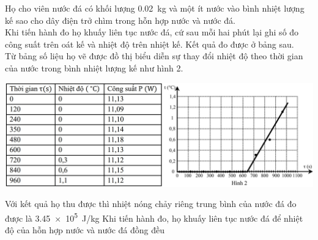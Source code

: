 \begin{ex}
	Họ cho viên nước đá có khối lượng \SI{0.02}{\kilogram} và một ít nước vào bình nhiệt lượng kế sao cho dây điện trở chìm trong hỗn hợp nước và nước đá.\\
	Khi tiến hành đo họ khuấy liên tục nước đá, cứ sau mỗi hai phút lại ghi số đo công suất trên oát kế và nhiệt độ trên nhiệt kế. Kết quả đo được ở bảng sau.\\
	Từ bảng số liệu họ vẽ được đồ thị biểu diễn sự thay đổi nhiệt độ theo thời gian của nước trong bình nhiệt lượng kế như hình 2.
	\begin{center}
		\includegraphics[scale=0.5]{figs/G12Y24B5-2}
	\end{center}
	{Với kết quả họ thu được thì nhiệt nóng chảy riêng trung bình của nước đá đo được là \SI{3.45e5}{\joule/\kilogram}}
	{\True Khi tiến hành đo, họ khuấy liên tục nước đá để nhiệt độ của hỗn hợp nước và nước đá đồng đều}

\end{ex}
